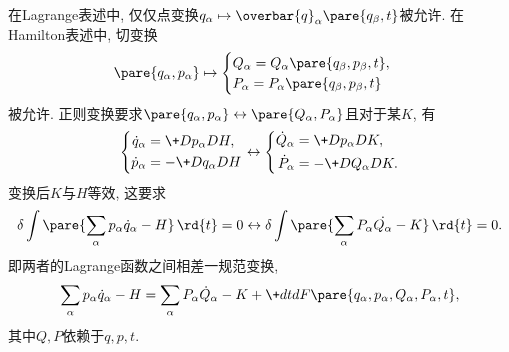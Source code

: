 \documentclass{ctexart}
\begin{document}
在Lagrange表述中, 仅仅点变换$q_\alpha\mapsto \overbar{q}_\alpha\pare{q_\beta,t}$被允许. 在Hamilton表述中, 切变换
\[ \pare{q_\alpha,p_\alpha} \mapsto \begin{cases}
    Q_\alpha = Q_\alpha \pare{q_\beta,p_\beta,t}, \\
    P_\alpha = P_\alpha\pare{q_\beta,p_\beta,t}
\end{cases} \]
被允许. 正则变换要求$\pare{q_\alpha,p_\alpha}\leftrightarrow \pare{Q_\alpha,P_\alpha}$且对于某$K$, 有
\[ \left\{\begin{aligned}
    \dot{q}_\alpha &= \+D{p_\alpha}DH, \\
    \dot{p}_\alpha &= -\+D{q_\alpha}DH
\end{aligned}\right. \leftrightarrow \left\{\begin{aligned}
    \dot{Q}_\alpha &= \+D{p_\alpha}DK, \\
    \dot{P}_\alpha &= -\+D{Q_\alpha}DK.
\end{aligned}\right. \]
变换后$K$与$H$等效, 这要求
\[ \delta \int\pare{\sum_\alpha p_\alpha\dot{q}_\alpha - H}\,\rd{t} = 0 \leftrightarrow \delta \int\pare{\sum_\alpha P_\alpha\dot{Q_\alpha} - K}\,\rd{t} = 0. \]
即两者的Lagrange函数之间相差一规范变换,
\[ \sum_\alpha p_\alpha \dot{q}_\alpha - H = \sum_\alpha P_\alpha\dot{Q}_\alpha - K + \+dtd{}F\pare{q_\alpha,p_\alpha,Q_\alpha,P_\alpha,t}, \]
其中$Q,P$依赖于$q,p,t$.
\end{document}

